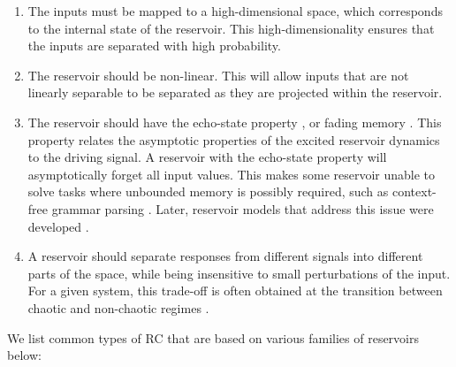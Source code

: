 \begin{enumerate}
  \item The inputs must be mapped to a high-dimensional space, which
        corresponds to the internal state of the reservoir. This
        high-dimensionality ensures that the inputs are separated with high
        probability.

  \item The reservoir should be non-linear. This will allow inputs that are not
        linearly separable to be separated as they are projected within the
        reservoir.

  \item The reservoir should have the echo-state property
        \parencite{jaegerEchoStateApproach2001, yildizRevisitingEchoState2012},
        or fading memory \parencite{boydFadingMemoryProblem1985,
        maassRealTimeComputingStable2002, maassFadingMemoryKernel2004}. This
        property relates the asymptotic properties of the excited reservoir dynamics
        to the driving signal. A reservoir with the echo-state property will
        asymptotically forget all input values. This makes some reservoir unable
        to solve tasks where unbounded memory is possibly required, such as
        context-free grammar parsing
        \parencite{schmidhuberTrainingRecurrentNetworks2007}. Later, reservoir
        models that address this issue were developed
        \parencite{pascanuNeurodynamicalModelWorking2011}.

  \item A reservoir should separate responses from different signals into
        different parts of the space, while being insensitive to small
        perturbations of the input. For a given system, this trade-off is often
        obtained at the transition between chaotic and non-chaotic regimes
        \parencite{bertschingerRealtimeComputationEdge2004,
        legensteinEdgeChaosPrediction2007}.
\end{enumerate}

We list common types of \ac{RC} that are based on various families of reservoirs
below:

